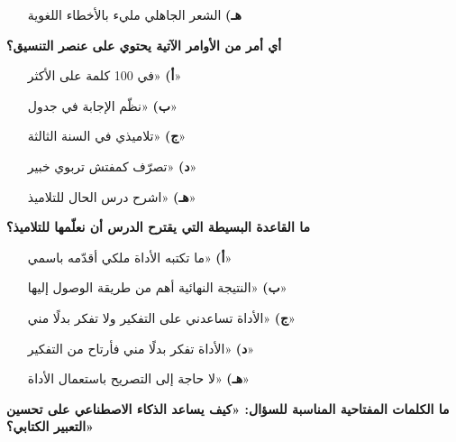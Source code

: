 \documentclass[11pt,a4paper]{article}
\begin{document}
\begin{multicols}{2}
\begin{minipage}{\linewidth}
\begin{itemize}[leftmargin=0.95cm, labelsep=4pt, itemsep=0pt, topsep=2pt, parsep=0pt]
  \item[\textbf{هـ)}] الشعر الجاهلي مليء بالأخطاء اللغوية
\end{itemize}
\end{minipage}\par\vspace{7pt plus 4pt}
\noindent\begin{minipage}{\linewidth}
\hangindent=0.7cm\textbf{أي أمر من الأوامر الآتية يحتوي على عنصر التنسيق؟}
\begin{itemize}[leftmargin=0.95cm, labelsep=4pt, itemsep=0pt, topsep=2pt, parsep=0pt]
  \item[\textbf{أ)}] «في 100 كلمة على الأكثر»
  \item[\textbf{ب)}] «نظّم الإجابة في جدول»
  \item[\textbf{ج)}] «تلاميذي في السنة الثالثة»
  \item[\textbf{د)}] «تصرّف كمفتش تربوي خبير»
  \item[\textbf{هـ)}] «اشرح درس الحال للتلاميذ»
\end{itemize}
\end{minipage}\par\vspace{7pt plus 4pt}
\noindent\begin{minipage}{\linewidth}
\hangindent=0.7cm\textbf{ما القاعدة البسيطة التي يقترح الدرس أن نعلّمها للتلاميذ؟}
\begin{itemize}[leftmargin=0.95cm, labelsep=4pt, itemsep=0pt, topsep=2pt, parsep=0pt]
  \item[\textbf{أ)}] «ما تكتبه الأداة ملكي أقدّمه باسمي»
  \item[\textbf{ب)}] «النتيجة النهائية أهم من طريقة الوصول إليها»
  \item[\textbf{ج)}] «الأداة تساعدني على التفكير ولا تفكر بدلًا مني»
  \item[\textbf{د)}] «الأداة تفكر بدلًا مني فأرتاح من التفكير»
  \item[\textbf{هـ)}] «لا حاجة إلى التصريح باستعمال الأداة»
\end{itemize}
\end{minipage}\par\vspace{7pt plus 4pt}
\noindent\begin{minipage}{\linewidth}
\hangindent=0.7cm\textbf{ما الكلمات المفتاحية المناسبة للسؤال: «كيف يساعد الذكاء الاصطناعي على تحسين التعبير الكتابي؟»}
\begin{itemize}[leftmargin=0.95cm, labelsep=4pt, itemsep=0pt, topsep=2pt, parsep=0pt]

\end{itemize}
\end{minipage}
\end{multicols}
\end{document}
